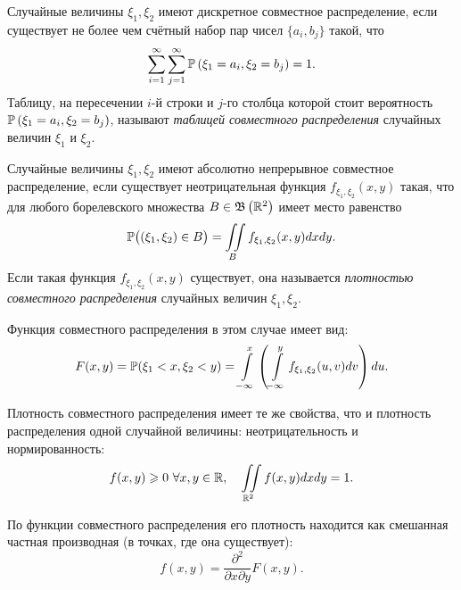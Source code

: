 \begin{defn}
    Случайные величины $\xi_1, \xi_2$ имеют дискретное совместное распределение, если существует не более чем счётный набор пар чисел $\{a_{i}, b_{j}\}$ такой, что
    \begin{equation*}
        \sum\limits_{i=1}^{\infty} \sum\limits_{j=1}^{\infty} \operatorname{\mathbb{P}}\left(\xi_{1}=a_{i}, \xi_{2}=b_{j}\right)=1.
    \end{equation*}
    Таблицу, на пересечении $i$-й строки и $j$-го столбца которой стоит вероятность $\operatorname{\mathbb{P}}\left(\xi_{1}=a_{i}, \xi_{2}=b_{j}\right)$, называют \textit{таблицей совместного распределения} случайных величин $\xi_1$ и $\xi_2$.
\end{defn}
\begin{defn}
    Случайные величины $\xi_1, \xi_2$ имеют абсолютно непрерывное совместное распределение, если существует неотрицательная функция $f_{\xi_{1}, \xi_{2}}(x, y)$ такая, что для любого борелевского множества $B \in \mathfrak{B}\left(\mathbb{R}^{2}\right)$ имеет место равенство
    \begin{equation*}
        \operatorname{\mathbb{P}}\bigl(\left(\xi_{1}, \xi_{2}\right) \in B\bigr)=\iint\limits_{B} f_{\xi_{1}, \xi_{2}}(x, y) dx dy.
    \end{equation*}
    Если такая функция $f_{\xi_{1}, \xi_{2}}(x, y)$ существует, она называется \textit{плотностью совместного распределения} случайных величин $\xi_1, \xi_2$.
    
    Функция совместного распределения в этом случае имеет вид:
    \begin{equation*}
        F(x, y)=\operatorname{\mathbb{P}}(\xi_{1}<x, \xi_{2}<y)=\int\limits_{-\infty}^{x}\left(\int\limits_{-\infty}^{y} f_{\xi_{1}, \xi_{2}}(u, v) dv\right) du.
    \end{equation*}
\end{defn}

\begin{rmrk}
    Плотность совместного распределения имеет те же свойства, что и плотность распределения одной случайной величины: неотрицательность и нормированность:
    \begin{equation*}
        f(x, y) \geqslant 0~ \forall x, y \in \mathbb{R}, \quad \iint\limits_{\mathbb{R}^{2}} f(x, y) dx dy = 1.
    \end{equation*}

    По функции совместного распределения его плотность находится как смешанная частная производная (в точках, где она существует):
    \begin{equation*}
        f(x, y)=\frac{\partial^{2}}{\partial x \partial y} F(x, y).
    \end{equation*}
\end{rmrk}

